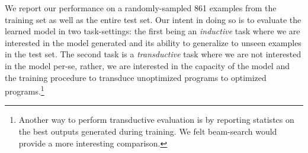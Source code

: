 \documentclass{article}
\def\correctfuncio/{\ensuremath{\mathcal{D}_\textrm{I/O}}}
\def\correctfuncsmt/{\ensuremath{\mathcal{D}_\textrm{verifier}}}
\begin{document}
We report our performance on a randomly-sampled 861 examples from the training set as well as the entire test set. Our intent in doing so is to evaluate the learned model in two task-settings: the first being an \textit{inductive} task where we are interested in the model generated and its ability to generalize to unseen examples in the test set. The second task is a \textit{transductive} task where we are not interested in the model per-se, rather, we are interested in the capacity of the model and the training procedure to transduce unoptimized programs to optimized programs.\footnote{Another way to perform transductive evaluation is by reporting statistcs on the best outputs generated during training. We felt beam-search would provide a more interesting comparison.}





\end{document}
